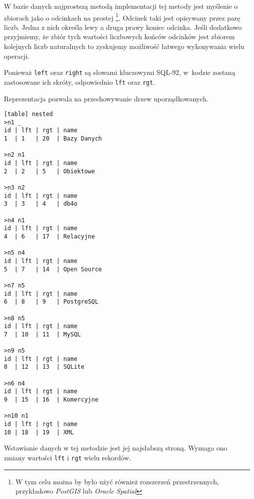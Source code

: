 W bazie danych najprostszą metodą implementacji tej metody jest myślenie o zbiorach jako o odcinkach na prostej%
\footnote{W tym celu można by było użyć również rozszerzeń przestrzennych, przykładowo \emph{PostGIS} lub \emph{Oracle Spatial}}.
Odcinek taki jest opisywany przez parę liczb.
Jedna z nich określa lewy a druga prawy koniec odcinka.
Jeśli dodatkowo przyjmiemy, że zbiór tych wartości liczbowych końców odcinków
jest zbiorem kolejnych liczb naturalnych to zyskujemy możliwość łatwego wykonywania wielu operacji.

Ponieważ \texttt{left} oraz \texttt{right} są słowami kluczowymi SQL-92,
w~kodzie zostaną zastosowane ich skróty, odpowiednio \texttt{lft} oraz \texttt{rgt}.

Reprezentacja pozwala na przechowywanie drzew uporządkowanych.


\begin{verbatim}[table] nested
>n1 _
id | lft | rgt | name
1  | 1   | 20  | Bazy Danych

>n2 n1
id | lft | rgt | name
2  | 2   | 5   | Obiektowe

>n3 n2
id | lft | rgt | name
3  | 3   | 4   | db4o

>n4 n1
id | lft | rgt | name
4  | 6   | 17  | Relacyjne

>n5 n4
id | lft | rgt | name
5  | 7   | 14  | Open Source

>n7 n5
id | lft | rgt | name
6  | 8   | 9   | PostgreSQL

>n8 n5
id | lft | rgt | name
7  | 10  | 11  | MySQL

>n9 n5
id | lft | rgt | name
8  | 12  | 13  | SQLite

>n6 n4
id | lft | rgt | name
9  | 15  | 16  | Komercyjne

>n10 n1
id | lft | rgt | name
10 | 18  | 19  | XML

\end{verbatim}







Wstawianie danych w tej metodzie jest jej najsłabszą stroną.
Wymaga ono zmiany wartości \texttt{lft} i \texttt{rgt} wielu rekordów.

